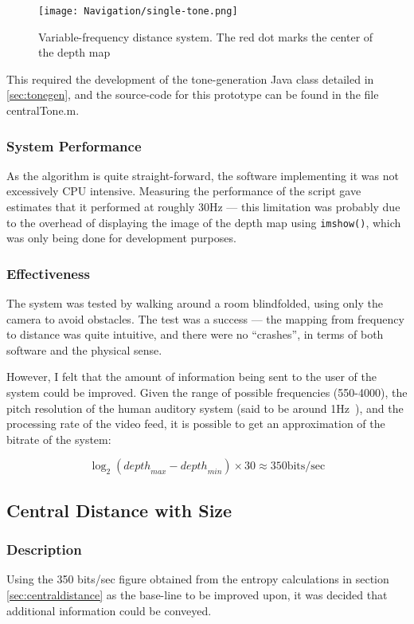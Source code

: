 \begin{figure}[H]
\centering
\texttt{[image: Navigation/single-tone.png]}
\caption{Variable-frequency distance system. The red dot marks the center of the depth map}
\end{figure}

This required the development of the tone-generation Java class detailed in \ref{sec:tonegen}, and the source-code for this prototype can be found in the file centralTone.m.

\subsubsection{System Performance}
As the algorithm is quite straight-forward, the software implementing it was not excessively CPU intensive. Measuring the performance of the script gave estimates that it performed at roughly 30Hz --- this limitation was probably due to the overhead of displaying the image of the depth map using \texttt{imshow()}, which was only being done for development purposes.

\subsubsection{Effectiveness}
The system was tested by walking around a room blindfolded, using only the camera to avoid obstacles. The test was a success --- the mapping from frequency to distance was quite intuitive, and there were no ``crashes'', in terms of both software and the physical sense.

However, I felt that the amount of information being sent to the user of the system could be improved. Given the range of possible frequencies (550-4000), the pitch resolution of the human auditory system (said to be around 1Hz~\cite{pitchres}), and the processing rate of the video feed, it is possible to get an approximation of the bitrate of the system:

\begin{equation}
\log _2\left({depth}_{max} - {depth}_{min}\right) \times 30 \approx 350 \mbox{bits/sec}
\end{equation}

\subsection{Central Distance with Size}
\subsubsection{Description}
Using the 350 bits/sec figure obtained from the entropy calculations in section \ref{sec:centraldistance} as the base-line to be improved upon, it was decided that additional information could be conveyed.

